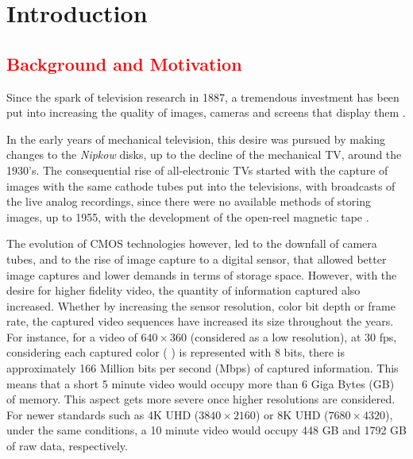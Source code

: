 \cleardoublepage
{}
\chapter{Introduction}

\section{\textcolor{red}{Background and Motivation}}

Since the spark of television research in 1887, a tremendous investment has been put into increasing the quality of images, cameras and screens that display them \cite{schubinWhatSparkedVideo2017}.

In the early years of mechanical television, this desire was pursued by making changes to the \textit{Nipkow} disks, up to the decline of the mechanical TV, around the 1930's. The consequential rise of all-electronic TVs started with the capture of images with the same cathode tubes put into the televisions, with broadcasts of the live analog recordings, since there were no available methods of storing images, up to 1955, with the development of the open-reel magnetic tape \cite{jacobsBriefHistoryVideo}.

The evolution of \Gls{CMOS} technologies however, led to the downfall of camera tubes, and to the rise of image capture to a digital sensor, that allowed better image captures and lower demands in terms of storage space. However, with the desire for higher fidelity video, the quantity of information captured also increased. Whether by increasing the sensor resolution, color bit depth or frame rate, the captured video sequences have increased its size throughout the years. For instance, for a video of $640 \times 360$ (considered as a low resolution), at 30 \gls{fps}, considering each captured color (
) is represented with 8 bits, there is approximately 166 Million bits per second (Mbps) of captured information. This means that a short 5 minute video would occupy more than 6 Giga Bytes (GB) of memory. This aspect gets more severe once higher resolutions are considered. For newer standards such as 4K \Gls{UHD} ($3840 \times 2160$) or 8K UHD ($ 7680 \times 4320$), under the same conditions, a 10 minute video would occupy 448 GB and 1792 GB of raw data, respectively.

